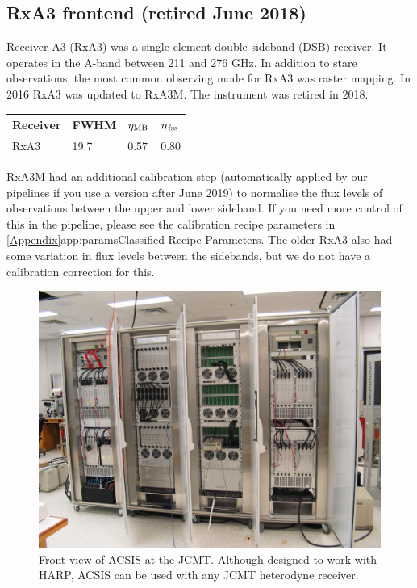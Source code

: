 \documentclass[11pt,oneside,chapters]{starlink}
\newcommand{\uarcs}{\hspace{-0.27em}\arcsec\hspace{-0.07em}}
\newcommand{\uarcs}{$''$}
\begin{document}
\subsection{RxA3 frontend (retired June 2018)}

Receiver A3 (RxA3) was a single-element double-sideband (DSB) receiver. It
operates in the A-band between 211 and 276 GHz. In addition to stare
observations, the most common observing mode for RxA3 was raster
mapping. In 2016 RxA3 was updated to RxA3M. The instrument was retired in 2018.

\begin{table}[h!]
\begin{center}
\begin{tabular}{|p{1.5cm}|p{1.2cm}|p{0.8cm}|p{0.8cm}|}
\hline
Receiver &FWHM & $\eta_{\textnormal{MB}}$ & $\eta_{\textnormal{\,fss}}$\\
\hline
RxA3&19.\uarcs7&0.57 & 0.80\\
\hline
\end{tabular}
\end{center}
\end{table}

RxA3M had an additional calibration step (automatically applied by our
pipelines if you use a version after June 2019) to normalise the flux
levels of observations between the upper and lower sideband. If you
need more control of this in the pipeline, please see the calibration
recipe parameters in \cref{Appendix}{app:params}{Classified Recipe
Parameters}.  The older RxA3 also had some variation in flux levels
between the sidebands, but we do not have a calibration correction for
this.


\begin{figure}[b!]
\begin{center}
\includegraphics[width=0.7\linewidth]{sc20_acsis_front_sm}
\caption[Front view of ACSIS at the JCMT]{\label{fig:acsis}
  Front view of ACSIS at the JCMT. Although designed to work with HARP,
  ACSIS can be used with any JCMT heterodyne receiver.}
\end{center}
\end{figure}
\end{document}

